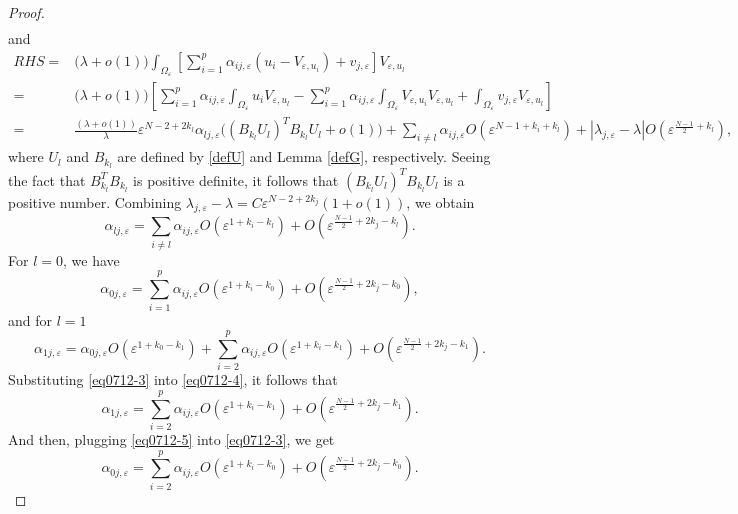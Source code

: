 \documentclass[11pt,reqno]{article}
\numberwithin{equation}{section}
\newcommand\e\varepsilon
\newcommand\la\lambda
\renewcommand\O\Omega
\begin{document}
\begin{proof}
\begin{equation}
\begin{aligned}
            \end{aligned}
        \end{equation}
        and
        \begin{equation}\label{eq0612-2}
            \begin{aligned}
                RHS=&\big(\la+o(1)\big)\int_{\O_\e}\left[ \sum_{i=1}^{p}\alpha_{ij,\e} (u_i-V_{\e,u_i})+ v_{j,\e}\right]V_{\e,u_l}\\
				=&\big(\la+o(1)\big)\left[ \sum_{i=1}^{p}\alpha_{ij,\e}\int_{\O_\e}u_iV_{\e,u_l}- \sum_{i=1}^{p}\alpha_{ij,\e}\int_{\O_\e}V_{\e,u_i}V_{\e,u_l}+\int_{\O_\e}v_{j,\e}V_{\e,u_l}\right]\\
				=&\frac{(\la+o(1))}{\la }\e^{N-2+2{ k_l}}\alpha_{lj,\e}\Bigg((B_{ k_l}U_l)^TB_{ k_l}U_l+o(1)\Bigg)+\sum_{i\neq l}\alpha_{ij,\e}O(\e^{N-1+{ k_i}+{ k_l}})
                +|\lambda_{j,\e}-\lambda|O(\e^{\frac{N-1}{2}+{ k_l}}),
            \end{aligned}
        \end{equation}
       where $U_l$ and $B_{ k_l}$ are defined by \eqref{defU} and Lemma \ref{defG}, respectively. 
Seeing the fact that $B_{ k_l}^TB_{ k_l}$ is positive definite, it follows that $(B_{ k_l}U_l)^TB_{ k_l}U_l$ is a positive number. Combining $\lambda_{j,\e}-\lambda=C\e^{N-2+2{ k_j}}(1+o(1))$, we obtain 
\begin{equation}\label{eqRelationa}
    \alpha_{lj,\e}=\sum_{i\neq l}\alpha_{ij,\e}O(\e^{1+{ k_i}-{ k_l}})+O(\e^{\frac{N-1}{2}+2{ k_j}-{ k_l}}).
\end{equation}
For  $l=0$, we have
\begin{equation}\label{eq0712-3}
    \alpha_{0j,\e}= \sum_{i=1}^{p}\alpha_{ij,\e}O(\e^{1+{ k_i-k_0}})+O(\e^{\frac{N-1}{2}+2{ k_j-k_0}}),
\end{equation}
and for $l=1$
\begin{equation}\label{eq0712-4}
    \alpha_{1j,\e}=\alpha_{0j,\e}O(\e^{1+{ k_0}-{ k_1}})+{ \sum_{i=2}^{p}}\alpha_{ij,\e}O(\e^{1+{ k_i}-{ k_1}})+O(\e^{\frac{N-1}{2}+2{ k_j}-{ k_1}}).
\end{equation}
Substituting \eqref{eq0712-3} into \eqref{eq0712-4}, it follows that
\begin{equation}\label{eq0712-5}
    \alpha_{1j,\e}={ \sum_{i=2}^{p}}\alpha_{ij,\e}O(\e^{1+{ k_i}-{ k_1}})+O(\e^{\frac{N-1}{2}+2{ k_j}-{ k_1}}).
\end{equation}
And then, plugging \eqref{eq0712-5} into \eqref{eq0712-3}, we get
\begin{equation}\label{eq0712-6}
   \alpha_{0j,\e}={ \sum_{i=2}^{p}}\alpha_{ij,\e}O(\e^{1+{k_i-k_0}})+O(\e^{\frac{N-1}{2}+2{ k_j-k_0}}).
\end{equation}


\end{proof}
\end{document}
